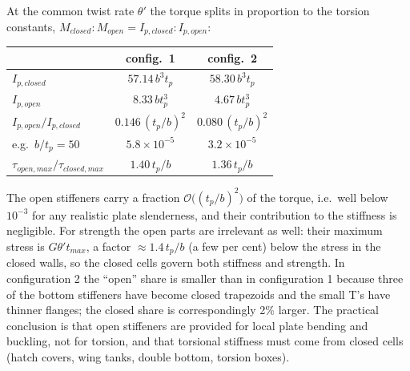 \begin{enumerate}[label=\alph*.]
  At the common twist rate $\theta'$ the torque splits in proportion to the torsion constants, $M_{closed}:M_{open}=I_{p,closed}:I_{p,open}$:
  \begin{center}\small
  \begin{tabular}{lcc}
    \toprule
     & config.\ 1 & config.\ 2 \\
    \midrule
    $I_{p,closed}$ & $57.14\,b^3t_p$ & $58.30\,b^3t_p$ \\
    $I_{p,open}$ & $8.33\,bt_p^3$ & $4.67\,bt_p^3$ \\
    $I_{p,open}/I_{p,closed}$ & $0.146\,(t_p/b)^2$ & $0.080\,(t_p/b)^2$ \\
    e.g.\ $b/t_p=50$ & $5.8\times10^{-5}$ & $3.2\times10^{-5}$ \\
    $\tau_{open,max}/\tau_{closed,max}$ & $1.40\,t_p/b$ & $1.36\,t_p/b$ \\
    \bottomrule
  \end{tabular}
  \end{center}
  The open stiffeners carry a fraction $\mathcal O\big((t_p/b)^2\big)$ of the torque, i.e.\ well below $10^{-3}$ for any realistic plate slenderness, and their contribution to the stiffness is negligible. For strength the open parts are irrelevant as well: their maximum stress is $G\theta't_{max}$, a factor $\approx1.4\,t_p/b$ (a few per cent) below the stress in the closed walls, so the closed cells govern both stiffness and strength. In configuration 2 the ``open'' share is smaller than in configuration 1 because three of the bottom stiffeners have become closed trapezoids and the small T's have thinner flanges; the closed share is correspondingly 2\% larger. The practical conclusion is that open stiffeners are provided for local plate bending and buckling, not for torsion, and that torsional stiffness must come from closed cells (hatch covers, wing tanks, double bottom, torsion boxes).
\end{enumerate}
